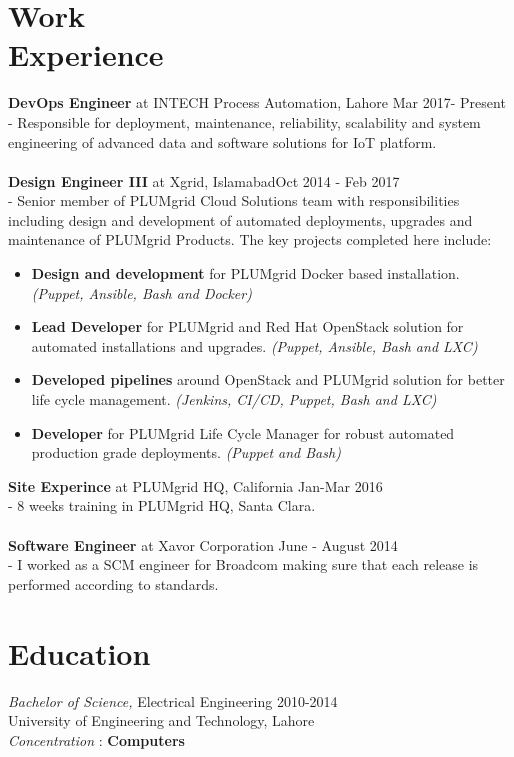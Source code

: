 \documentclass[margin]{res}
\begin{document}
\begin{resume}
\section{Work \\ Experience}
\textbf{DevOps Engineer} at INTECH Process Automation, Lahore \hfill     Mar 2017- Present \\
- Responsible for deployment, maintenance, reliability, scalability and system engineering of advanced data and software solutions for IoT platform.   \\ \\
{\bf Design Engineer III} at Xgrid, Islamabad\hfill     Oct 2014 - Feb 2017 \\
- Senior member of PLUMgrid Cloud Solutions team with responsibilities including design and development of automated deployments, upgrades and maintenance of PLUMgrid Products. The key projects completed here include:
    \begin{itemize}  \itemsep -2pt %
        \item \textbf{Design and development} for PLUMgrid Docker based installation. \textit{(Puppet, Ansible, Bash and Docker)}
        \item \textbf{Lead Developer} for PLUMgrid and Red Hat OpenStack solution for automated installations and upgrades. \textit{(Puppet, Ansible, Bash and LXC)}
        \item \textbf{Developed pipelines} around OpenStack and PLUMgrid solution for better life cycle management. \textit{(Jenkins, CI/CD, Puppet, Bash and LXC)}
        \item \textbf{Developer} for PLUMgrid Life Cycle Manager for robust automated production grade deployments. \textit{(Puppet and Bash)}
    \end{itemize}

\textbf{Site Experince} at PLUMgrid HQ, California \hfill     Jan-Mar 2016 \\
- 8 weeks training in PLUMgrid HQ, Santa Clara.   \\ \\
\textbf{Software Engineer} at Xavor Corporation \hfill     June - August 2014 \\
- I worked as a SCM engineer for Broadcom making sure that each release is performed according to standards.

\section{Education} {\sl Bachelor of Science,} Electrical Engineering \hfill 2010-2014 \\
                University of Engineering and Technology, Lahore \\
	             \textit{Concentration} : \textbf{Computers}


\end{resume}
\end{document}
